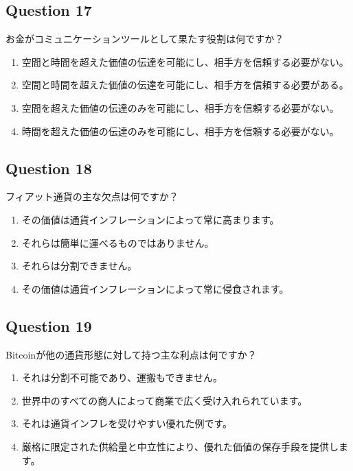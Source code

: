 \documentclass[12pt,a4paper]{article}
\begin{document}
\bigskip


\subsection*{Question 17}
お金がコミュニケーションツールとして果たす役割は何ですか？

\begin{enumerate}[label=\Alph*., leftmargin=*]
\item 空間と時間を超えた価値の伝達を可能にし、相手方を信頼する必要がない。
\item 空間と時間を超えた価値の伝達を可能にし、相手方を信頼する必要がある。
\item 空間を超えた価値の伝達のみを可能にし、相手方を信頼する必要がない。
\item 時間を超えた価値の伝達のみを可能にし、相手方を信頼する必要がない。
\end{enumerate}

\bigskip


\subsection*{Question 18}
フィアット通貨の主な欠点は何ですか？

\begin{enumerate}[label=\Alph*., leftmargin=*]
\item その価値は通貨インフレーションによって常に高まります。
\item それらは簡単に運べるものではありません。
\item それらは分割できません。
\item その価値は通貨インフレーションによって常に侵食されます。
\end{enumerate}

\bigskip


\subsection*{Question 19}
Bitcoinが他の通貨形態に対して持つ主な利点は何ですか？

\begin{enumerate}[label=\Alph*., leftmargin=*]
\item それは分割不可能であり、運搬もできません。
\item 世界中のすべての商人によって商業で広く受け入れられています。
\item それは通貨インフレを受けやすい優れた例です。
\item 厳格に限定された供給量と中立性により、優れた価値の保存手段を提供します。
\end{enumerate}
\end{document}

